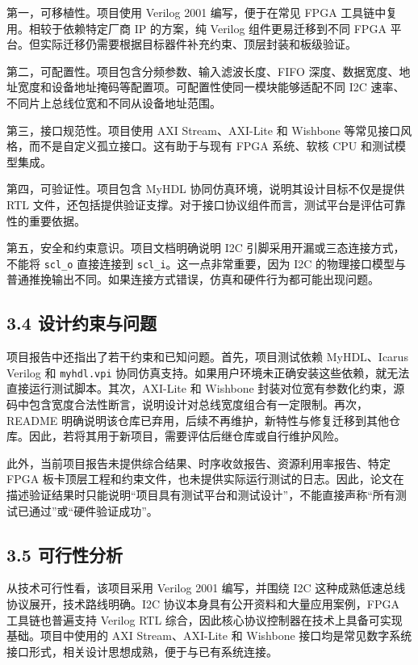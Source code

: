 第一，可移植性。项目使用 Verilog 2001 编写，便于在常见 FPGA 工具链中复用。相较于依赖特定厂商 IP 的方案，纯 Verilog 组件更易迁移到不同 FPGA 平台。但实际迁移仍需要根据目标器件补充约束、顶层封装和板级验证。

第二，可配置性。项目包含分频参数、输入滤波长度、FIFO 深度、数据宽度、地址宽度和设备地址掩码等配置项。可配置性使同一模块能够适配不同 I2C 速率、不同片上总线位宽和不同从设备地址范围。

第三，接口规范性。项目使用 AXI Stream、AXI-Lite 和 Wishbone 等常见接口风格，而不是自定义孤立接口。这有助于与现有 FPGA 系统、软核 CPU 和测试模型集成。

第四，可验证性。项目包含 MyHDL 协同仿真环境，说明其设计目标不仅是提供 RTL 文件，还包括提供验证支撑。对于接口协议组件而言，测试平台是评估可靠性的重要依据。

第五，安全和约束意识。项目文档明确说明 I2C 引脚采用开漏或三态连接方式，不能将 \texttt{scl\_o} 直接连接到 \texttt{scl\_i}。这一点非常重要，因为 I2C 的物理接口模型与普通推挽输出不同。如果连接方式错误，仿真和硬件行为都可能出现问题。

\subsection{3.4 设计约束与问题}\label{ux8bbeux8ba1ux7ea6ux675fux4e0eux95eeux9898}

项目报告中还指出了若干约束和已知问题。首先，项目测试依赖 MyHDL、Icarus Verilog 和 \texttt{myhdl.vpi} 协同仿真支持。如果用户环境未正确安装这些依赖，就无法直接运行测试脚本。其次，AXI-Lite 和 Wishbone 封装对位宽有参数化约束，源码中包含宽度合法性断言，说明设计对总线宽度组合有一定限制。再次，README 明确说明该仓库已弃用，后续不再维护，新特性与修复迁移到其他仓库。因此，若将其用于新项目，需要评估后继仓库或自行维护风险。

此外，当前项目报告未提供综合结果、时序收敛报告、资源利用率报告、特定 FPGA 板卡顶层工程和约束文件，也未提供实际运行测试的日志。因此，论文在描述验证结果时只能说明``项目具有测试平台和测试设计''，不能直接声称``所有测试已通过''或``硬件验证成功''。

\subsection{3.5 可行性分析}\label{ux53efux884cux6027ux5206ux6790}

从技术可行性看，该项目采用 Verilog 2001 编写，并围绕 I2C 这种成熟低速总线协议展开，技术路线明确。I2C 协议本身具有公开资料和大量应用案例，FPGA 工具链也普遍支持 Verilog RTL 综合，因此核心协议控制器在技术上具备可实现基础。项目中使用的 AXI Stream、AXI-Lite 和 Wishbone 接口均是常见数字系统接口形式，相关设计思想成熟，便于与已有系统连接。

